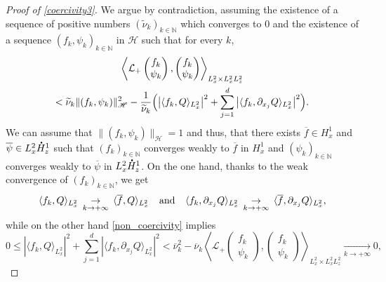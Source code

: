 \documentclass[10pt]{amsart}
\let\bar\oldbar
\let\tilde\oldtilde
\theoremstyle{definition}
\newcommand*{\overbigdot}[1]{%
\accentset{\mbox{\large\bfseries .}}{#1}}
\let\bar\overline
\let\tilde\widetilde
\newenvironment{ProofOf}[1]{\begin{proof}[Proof of #1]}{\end{proof}}
\begin{document}
\begin{ProofOf}{\eqref{coercivity3}}
We argue by contradiction, assuming the existence of a sequence of positive numbers $(\tilde{\nu}_{k})_{k\in\mathbb N}$ which converges to $0$ and the existence of a sequence $(f_{k},\psi_{k})_{k\in\mathbb N}$ in $\mathscr{H}$ such that for every $k$,
\begin{multline}\label{non_coercivity}
\left\langle\mathcal{L}_{+}\begin{pmatrix} f_{k}\\\psi_{k} \end{pmatrix},\begin{pmatrix} f_{k}\\\psi_{k} \end{pmatrix}\right\rangle_{L_{x}^{2}\times L_{x}^{2}L_{z}^{2}}
\\
<\tilde{\nu}_{k}\|(f_{k},\psi_{k})\|_{\mathscr{H}}^{2}-\frac{1}{\tilde{\nu}_{k}}\Bigl(\left|\langle f_{k},Q\rangle_{L_{x}^{2}}\right|^{2}+\sum\limits_{j=1}^{d}\left|\langle f_{k},\partial_{x_{j}}Q\rangle_{L_{x}^{2}}\right|^{2}\Bigr).
\end{multline}
We can assume that $\| (f_{k},\psi_{k})\|_{\mathscr{H}}=1$ and thus, that there exists $\bar{f}\in H_{x}^{1}$ and $\bar{\psi}\in L_{x}^{2}\overbigdot{H}_{z}^{1}$ such that $(f_{k})_{k\in\mathbb N}$ converges weakly to $\bar{f}$ in $H_{x}^{1}$ and $(\psi_{k})_{k\in\mathbb N}$ converges weakly to $\bar{\psi}$ in $L_{x}^{2}\overbigdot{H}_{z}^{1}$. On the one hand, thanks to the weak convergence of $(f_{k})_{k\in\mathbb N}$, we get
\[
\langle f_{k},Q\rangle_{L_{x}^{2}}\,\underset{k\to+\infty}{\to}\,\langle\bar{f},Q\rangle_{L_{x}^{2}} \hspace{0.25cm}\text{ and }\hspace{0.25cm} \langle f_{k},\partial_{x_{j}}Q\rangle_{L_{x}^{2}}\,\underset{k\to+\infty}{\to}\,\langle\bar{f},\partial_{x_{j}}Q\rangle_{L_{x}^{2}},
\]
while on the other hand \eqref{non_coercivity} implies
\[
0\leq\left|\langle f_{k},Q\rangle_{L_{x}^{2}}\right|^{2}+\sum\limits_{j=1}^{d}\left|\langle f_{k},\partial_{x_{j}}Q\rangle_{L_{x}^{2}}\right|^{2}<\bar{\nu}_{k}^{2}-\bar{\nu}_{k}\left\langle\mathcal{L}_{+}\begin{pmatrix} f_{k}\\\psi_{k} \end{pmatrix},\begin{pmatrix} f_{k}\\\psi_{k} \end{pmatrix}\right\rangle_{L_{x}^{2}\times L_{x}^{2}L_{z}^{2}}\underset{k\to+\infty}{\to}0,
\]
\end{ProofOf}
\end{document}
